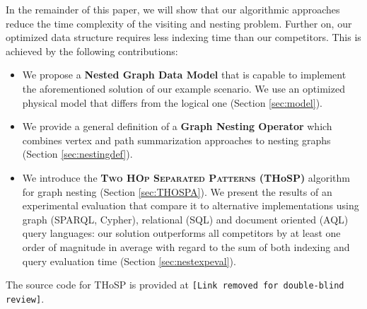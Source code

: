 \begin{ex}[label=ex2,continues=ex1]
\end{ex}



In the remainder of this paper, we will show that our algorithmic approaches reduce the time complexity of the visiting and nesting problem. Further on, our optimized data structure requires less indexing time than our competitors. This is achieved by the following contributions:

\begin{itemize}
	\item We propose a \textbf{Nested Graph Data Model} that is capable to implement the aforementioned solution of our example scenario. We use an optimized physical model that differs from the logical one (Section \ref{sec:model}).

	\item We provide  a general definition of a \textbf{Graph Nesting Operator} which combines vertex and path summarization approaches to nesting graphs (Section \ref{sec:nestingdef}).
	\item We introduce the  \textbf{\textsc{{Two HOp Separated Patterns}} (THoSP)} algorithm for graph nesting (Section \ref{sec:THOSPA}). We present the results of an experimental evaluation that compare it to alternative implementations using graph (SPARQL, Cypher), relational (SQL) and document oriented (AQL) query languages: our solution outperforms all competitors by at least one order of magnitude in average with regard to the sum of both indexing and query evaluation time (Section \ref{sec:nestexpeval}).

\end{itemize}

The source code for THoSP is provided at \texttt{\color{red}[Link removed for double-blind review]}.
